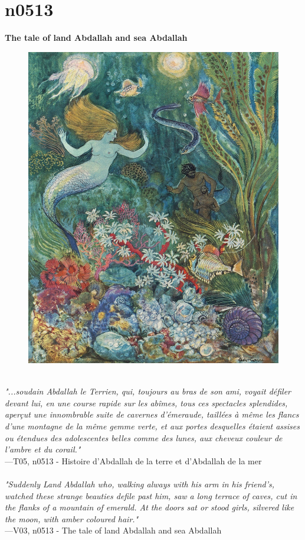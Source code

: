 \documentclass[../Carre_nights.tex]{subfiles}
\begin{document}
\newpage

\section{n0513}
\textbf{\Large{The tale of land Abdallah and sea Abdallah}} \\

\begin{figure}[ht]
\centering
\includegraphics[height=\figsize]{illustrations/volume_5/T05, n0513 - Histoire d'Abdallah de la terre et d'Abdallah de la mer.jpg}
\end{figure}

\textit{\\
"...soudain Abdallah le Terrien, qui, toujours au bras de son ami, voyait défiler devant lui, en une course rapide sur les abîmes, tous ces spectacles splendides, aperçut une innombrable suite de cavernes d’émeraude, taillées à même les flancs d’une montagne de la même gemme verte, et aux portes desquelles étaient assises ou étendues des adolescentes belles comme des lunes, aux cheveux couleur de l’ambre et du corail."} \\
—T05, n0513 - Histoire d'Abdallah de la terre et d'Abdallah de la mer \\~\\
\textit{"Suddenly Land Abdallah who, walking always with his arm in his friend's, watched these strange beauties defile past him, saw a long terrace of caves, cut in the flanks of a mountain of emerald. At the doors sat or stood girls, silvered like the moon, with amber coloured hair."} \\
—V03, n0513 - The tale of land Abdallah and sea Abdallah
\end{document}
